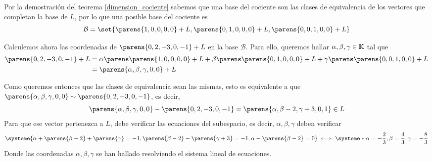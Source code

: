 \documentclass[../algebra_lineal.tex]{subfiles}
\begin{document}
\begin{solution}
Por la demostración del teorema \ref{dimension_cociente} sabemos que una base del cociente son las clases de equivalencia de los vectores que completan la base de $L$, por lo que una posible base del cociente es
\[
    \mathcal{B} = \set{\parens{1, 0, 0, 0, 0} + L, \parens{0, 1, 0, 0, 0} + L, \parens{0, 0, 1, 0, 0} + L}
\]

Calculemos ahora las coordenadas de $\parens{0, 2, -3, 0, -1} + L$ en la base $\mathcal{B}$. Para ello, queremos hallar $\alpha, \beta, \gamma \in \mathbb{K}$ tal que
\begin{align*}
    \parens{0, 2, -3, 0, -1} + L &= \alpha \ecl{\parens{1, 0, 0, 0, 0}} + \beta \ecl{\parens{0, 1, 0, 0, 0}} + \gamma \ecl{\parens{0, 0, 1, 0, 0}} \\
                                 &= \parens{\alpha, \beta, \gamma, 0, 0} + L
\end{align*}

Como queremos entonces que las clases de equivalencia sean las mismas, esto es equivalente a que $\parens{\alpha, \beta, \gamma, 0, 0} \sim \parens{0, 2, -3, 0, -1}$, es decir, 
\[
    \parens{\alpha, \beta, \gamma, 0, 0} - \parens{0, 2, -3, 0, -1}  = \parens{\alpha, \beta-2, \gamma+3, 0, 1} \in L
\]
Para que ese vector pertenezca a $L$, debe verificar las ecuaciones del subespacio, es decir, $\alpha, \beta, \gamma$ deben verificar
\[
    \systeme{
        \alpha + \parens{\beta - 2} + \parens{\gamma} = -1, 
        \parens{\beta - 2} - \parens{\gamma + 3} = -1, 
        \alpha - \parens{\beta - 2} = 0
        } \iff \systeme*{
            \alpha = -\frac{2}{3},
            \beta = \frac{4}{3},
            \gamma = -\frac{8}{3}
        }
\]
Donde las coordenadas $\alpha,\beta,\gamma$ se han hallado resolviendo el sistema lineal de ecuaciones.
\end{solution}
\end{document}
